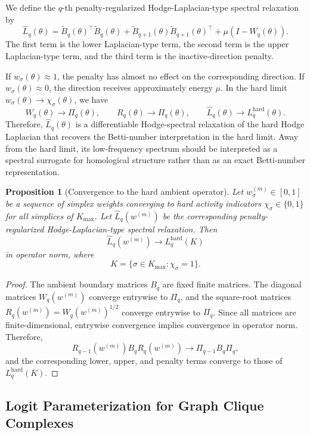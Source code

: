 \documentclass[pdflatex,sn-mathphys-ay]{sn-jnl}%
\theoremstyle{thmstyleone}%
\newtheorem{proposition}[theorem]{Proposition}%
\theoremstyle{thmstyletwo}%
\theoremstyle{thmstylethree}%
\begin{document}
We define the \(q\)-th penalty-regularized Hodge-Laplacian-type spectral relaxation by
\[
\widehat{L}_q(\theta)
=
\widetilde{B}_q(\theta)^\top
\widetilde{B}_q(\theta)
+
\widetilde{B}_{q+1}(\theta)
\widetilde{B}_{q+1}(\theta)^\top
+
\mu
\left(
I-W_q(\theta)
\right).
\]
The first term is the lower Laplacian-type term, the second term is the upper Laplacian-type term, and the third term is the inactive-direction penalty.

If \(w_\sigma(\theta)\approx 1\), the penalty has almost no effect on the corresponding direction. If \(w_\sigma(\theta)\approx 0\), the direction receives approximately energy \(\mu\). In the hard limit \(w_\sigma(\theta)\to \chi_\sigma(\theta)\), we have
\[
W_q(\theta)\to \Pi_q(\theta),
\qquad
R_q(\theta)\to \Pi_q(\theta),
\qquad
\widehat{L}_q(\theta)\to L_q^{\mathrm{hard}}(\theta).
\]
Therefore, \(\widehat{L}_q(\theta)\) is a differentiable Hodge-spectral relaxation of the hard Hodge Laplacian that recovers the Betti-number interpretation in the hard limit.
Away from the hard limit, its low-frequency spectrum should be interpreted as a spectral surrogate for homological structure rather than as an exact Betti-number representation.


\begin{proposition}[Convergence to the hard ambient operator]
Let \(w_\sigma^{(m)}\in[0,1]\) be a sequence of simplex weights converging to hard activity indicators \(\chi_\sigma\in\{0,1\}\) for all simplices of \(K_{\max}\). Let \(\widehat{L}_q(w^{(m)})\) be the corresponding penalty-regularized Hodge-Laplacian-type spectral relaxation. Then
\[
\widehat{L}_q(w^{(m)})
\longrightarrow
L_q^{\mathrm{hard}}(K)
\]
in operator norm, where
\[
K=\{\sigma\in K_{\max}:\chi_\sigma=1\}.
\]
\end{proposition}

\begin{proof}
The ambient boundary matrices \(B_q\) are fixed finite matrices. The diagonal matrices \(W_q(w^{(m)})\) converge entrywise to \(\Pi_q\), and the square-root matrices \(R_q(w^{(m)})=W_q(w^{(m)})^{1/2}\) converge entrywise to \(\Pi_q\). Since all matrices are finite-dimensional, entrywise convergence implies convergence in operator norm. Therefore,
\[
R_{q-1}(w^{(m)})B_qR_q(w^{(m)})
\longrightarrow
\Pi_{q-1}B_q\Pi_q,
\]
and the corresponding lower, upper, and penalty terms converge to those of \(L_q^{\mathrm{hard}}(K)\).
\end{proof}


\subsection{Logit Parameterization for Graph Clique Complexes}
\end{document}

